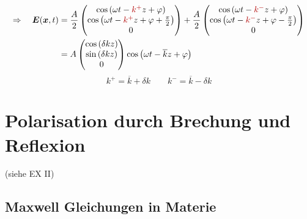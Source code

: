 \begin{align*}
\Rightarrow \quad \vec{E}(\vec{x},t) &= \frac{A}{2} \begin{pmatrix}
\cos\left(\omega t - \color{black!30!red}k^+\color{black}z + \varphi\right) \\ \cos\left(\omega t -\color{black!30!red}k^+\color{black}z + \varphi + \frac{\pi}{2}\right) \\ 0
\end{pmatrix} + \frac{A}{2} \begin{pmatrix}
\cos\left(\omega t - \color{black!30!red}k^-\color{black}z + \varphi\right) \\ \cos\left(\omega t - \color{black!30!red}k^-\color{black}z+\varphi-\frac{\pi}{2}\right) \\ 0
\end{pmatrix}\\
&=A \begin{pmatrix}
\cos\left(\delta kz\right) \\ \sin\left(\delta kz\right) \\ 0
\end{pmatrix} \cos\left(\omega t - \overline{k}z + \varphi\right)
\end{align*}
\begin{equation*}
k^+ = \overline{k} + \delta k \qquad k^- = \overline{k} - \delta k
\end{equation*}

\section{Polarisation durch Brechung und Reflexion}

(siehe EX II)

\subsection{Maxwell Gleichungen in Materie}

